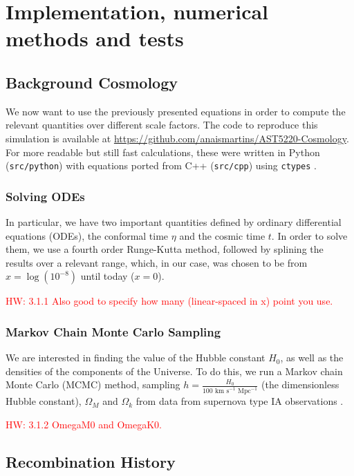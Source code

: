 \documentclass{aa}
\newcommand{\hw}[1]{\textcolor{red}{HW: #1}}
\begin{document}
\section{Implementation, numerical methods and tests}

\subsection{Background Cosmology}

We now want to use the previously presented equations in order to compute the relevant quantities over different scale factors. The code to reproduce this simulation is available at \url{https://github.com/anaismartins/AST5220-Cosmology}. For more readable but still fast calculations, these were written in Python (\texttt{src/python}) with equations ported from C++ (\texttt{src/cpp}) using \texttt{ctypes} \citep{ctypes}.

\subsubsection{Solving ODEs}

In particular, we have two important quantities defined by ordinary differential equations (ODEs), the conformal time $\eta$ and the cosmic time $t$. In order to solve them, we use a fourth order Runge-Kutta method, followed by splining the results over a relevant range, which, in our case, was chosen to be from $x=\log(10^{-8})$ until today ($x=0$).

\hw{3.1.1 Also good to specify how many (linear-spaced in x) point you use.}

\subsubsection{Markov Chain Monte Carlo Sampling}

We are interested in finding the value of the Hubble constant $H_0$, as well as the densities of the components of the Universe. To do this, we run a Markov chain Monte Carlo (MCMC) method, sampling $h = \frac{H_0}{100\text{ km s}^{-1}\text{ Mpc}^{-1}}$ (the dimensionless Hubble constant), $\Omega_M$ and $\Omega_k$ from data from supernova type IA observations \citep{Betoule_2014}.

\hw{3.1.2 OmegaM0 and OmegaK0.}

\subsection{Recombination History}
\end{document}
